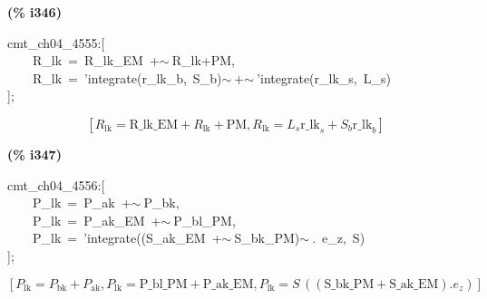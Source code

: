 \documentclass[fleqn]{article}
\begin{document}
\noindent
\begin{minipage}[t]{4.000000em}\color{red}\bfseries
(\% i346)	
\end{minipage}
\begin{minipage}[t]{\textwidth}\color{blue}
cmt\_ch04\_4555:[\\
\ \ \ \ R\_lk\ =\ R\_lk\_EM\ +\ensuremath{\sim\ }R\_lk+PM,\\
\ \ \ \ R\_lk\ =\ 'integrate(r\_lk\_b,\ S\_b)\ensuremath{\sim\ }+\ensuremath{\sim\ }'integrate(r\_lk\_s,\ L\_s)\\
];
\end{minipage}
\[\displaystyle \tag{\% o346} 
\left[ {R_{\ensuremath{\mathrm{lk}}}}=\ensuremath{\mathrm{R\_ lk\_ EM}}+{R_{\ensuremath{\mathrm{lk}}}}+\ensuremath{\mathrm{PM}}\operatorname{,}{R_{\ensuremath{\mathrm{lk}}}}={L_s} {{\ensuremath{\mathrm{r\_ lk}}}_s}+{S_b} {{\ensuremath{\mathrm{r\_ lk}}}_b}\right] \mbox{}
\]


\noindent
\begin{minipage}[t]{4.000000em}\color{red}\bfseries
(\% i347)	
\end{minipage}
\begin{minipage}[t]{\textwidth}\color{blue}
cmt\_ch04\_4556:[\\
\ \ \ \ P\_lk\ =\ P\_ak\ +\ensuremath{\sim\ }P\_bk,\\
\ \ \ \ P\_lk\ =\ P\_ak\_EM\ +\ensuremath{\sim\ }P\_bl\_PM,\\
\ \ \ \ P\_lk\ =\ 'integrate((S\_ak\_EM\ +\ensuremath{\sim\ }S\_bk\_PM)\ensuremath{\sim\ }.\ e\_z,\ S)\\
];
\end{minipage}
\[\displaystyle \tag{\% o347} 
\left[ {P_{\ensuremath{\mathrm{lk}}}}={P_{\ensuremath{\mathrm{bk}}}}+{P_{\ensuremath{\mathrm{ak}}}}\operatorname{,}{P_{\ensuremath{\mathrm{lk}}}}=\ensuremath{\mathrm{P\_ bl\_ PM}}+\ensuremath{\mathrm{P\_ ak\_ EM}}\operatorname{,}{P_{\ensuremath{\mathrm{lk}}}}=S\, \left( \left( \ensuremath{\mathrm{S\_ bk\_ PM}}+\ensuremath{\mathrm{S\_ ak\_ EM}}\right) \ensuremath{\mathrm{ . }}{e_z}\right) \right] \mbox{}
\]
\end{document}
